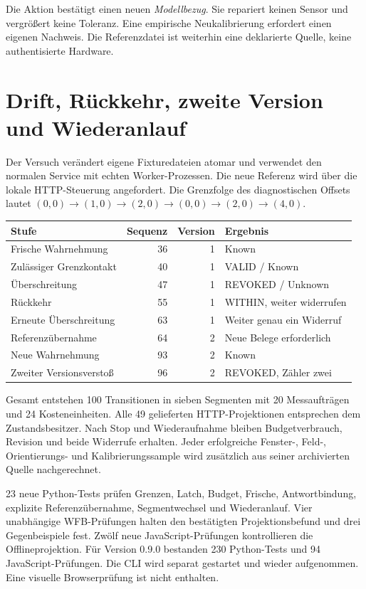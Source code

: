 \documentclass[11pt,a4paper]{article}
\newcommand{\nextsection}[2]{\clearpage{\color{accent}\small\textsf{#1}}\section{#2}}
\begin{document}
Die Aktion bestätigt einen neuen \emph{Modellbezug}. Sie repariert
keinen Sensor und vergrößert keine Toleranz. Eine empirische
Neukalibrierung erfordert einen eigenen Nachweis. Die Referenzdatei
ist weiterhin eine deklarierte Quelle, keine authentisierte Hardware.

\nextsection{54 / KONTROLLIERTER VERSUCH}{Drift, Rückkehr, zweite Version und Wiederanlauf}
Der Versuch verändert eigene Fixturedateien atomar und verwendet
den normalen Service mit echten Worker-Prozessen. Die neue
Referenz wird über die lokale HTTP-Steuerung angefordert.
Die Grenzfolge des diagnostischen Offsets lautet
$(0,0)\to(1,0)\to(2,0)\to(0,0)\to(2,0)\to(4,0)$.

\begin{center}\begin{tabular}{@{}lrrl@{}}\toprule
Stufe & Sequenz & Version & Ergebnis\\\midrule
Frische Wahrnehmung & 36 & 1 & Known\\
Zulässiger Grenzkontakt & 40 & 1 & VALID / Known\\
Überschreitung & 47 & 1 & REVOKED / Unknown\\
Rückkehr & 55 & 1 & WITHIN, weiter widerrufen\\
Erneute Überschreitung & 63 & 1 & Weiter genau ein Widerruf\\
Referenzübernahme & 64 & 2 & Neue Belege erforderlich\\
Neue Wahrnehmung & 93 & 2 & Known\\
Zweiter Versionsverstoß & 96 & 2 & REVOKED, Zähler zwei\\\bottomrule
\end{tabular}\end{center}

Gesamt entstehen 100 Transitionen in sieben Segmenten mit
20 Messaufträgen und 24 Kosteneinheiten. Alle 49 gelieferten
HTTP-Projektionen entsprechen dem Zustandsbesitzer. Nach Stop
und Wiederaufnahme bleiben Budgetverbrauch, Revision und beide
Widerrufe erhalten. Jeder erfolgreiche Fenster-, Feld-,
Orientierungs- und Kalibrierungssample wird zusätzlich aus seiner
archivierten Quelle nachgerechnet.

23 neue Python-Tests prüfen Grenzen, Latch, Budget, Frische,
Antwortbindung, explizite Referenzübernahme, Segmentwechsel und
Wiederanlauf. Vier unabhängige WFB-Prüfungen halten den bestätigten
Projektionsbefund und drei Gegenbeispiele fest. Zwölf neue
JavaScript-Prüfungen kontrollieren die Offlineprojektion.
Für Version 0.9.0 bestanden 230 Python-Tests und 94 JavaScript-Prüfungen.
Die CLI wird separat gestartet und wieder aufgenommen.
Eine visuelle Browserprüfung ist nicht enthalten.
\end{document}
